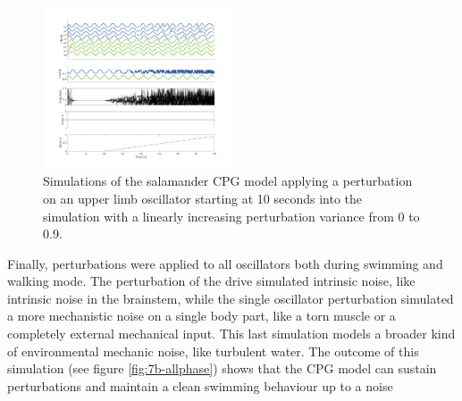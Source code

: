 \documentclass[a4paper]{scrartcl}
\begin{document}
\begin{figure}[h]
	\includegraphics[width=0.5\textwidth]{fig/figure7b_limbphase.png}
	\caption{Simulations of the salamander CPG model applying a perturbation on an upper limb oscillator starting at 10 seconds into the simulation with a linearly increasing perturbation variance from 0 to 0.9.}
	\label{fig:7b-limbphase}
\end{figure}

Finally, perturbations were applied to all oscillators both during swimming and walking mode. The perturbation of the drive simulated intrinsic noise, like intrinsic noise in the brainstem, while the single oscillator perturbation simulated a more mechanistic noise on a single body part, like a torn muscle or a completely external mechanical input. This last simulation models a broader kind of environmental mechanic noise, like turbulent water. The outcome of this simulation (see figure \ref{fig:7b-allphase}) shows that the CPG model can sustain perturbations and maintain a clean swimming behaviour up to a noise
\end{document}
